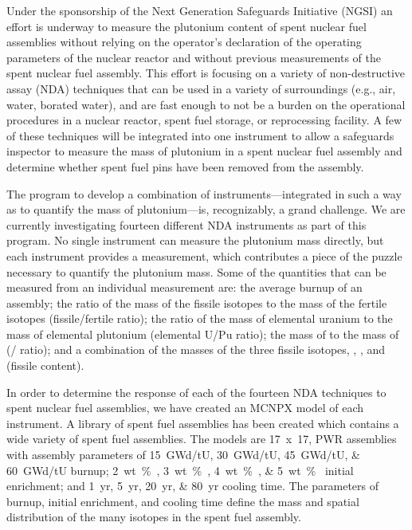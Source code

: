 \documentclass{ansnse}
\begin{document}
Under the sponsorship of the Next Generation Safeguards Initiative (NGSI) an effort is underway \citep{Tobin:2008Deter-0} to measure the plutonium content of spent nuclear fuel assemblies without relying on the operator's declaration of the operating parameters of the nuclear reactor and without previous measurements of the spent nuclear fuel assembly.  This effort is focusing on a variety of non-destructive assay (NDA) techniques that can be used in a variety of surroundings (e.g., air, water, borated water), and are fast enough to not be a burden on the operational procedures in a nuclear reactor, spent fuel storage, or reprocessing facility.  A few of these techniques will be integrated into one instrument to allow a safeguards inspector to measure the mass of plutonium in a spent nuclear fuel assembly and determine whether spent fuel pins have been removed from the assembly.

The program to develop a combination of instruments---integrated in such a way as to quantify the mass of plutonium---is, recognizably, a grand challenge.\cite{Veal:2010NGSI--0}  We are currently investigating fourteen different NDA instruments as part of this program.  No single instrument can measure the plutonium mass directly, but each instrument provides a measurement, which contributes a piece of the puzzle necessary to quantify the plutonium mass.  Some of the quantities that can be measured from an individual measurement are: the average burnup of an assembly; the ratio of the mass of the fissile isotopes to the mass of the fertile isotopes (fissile/fertile ratio); the ratio of the mass of elemental uranium to the mass of elemental plutonium (elemental U/Pu ratio); the mass of  to the mass of  (/ ratio); and a combination of the masses of the three fissile isotopes, , , and  (fissile content).

In order to determine the response of each of the fourteen NDA techniques to spent nuclear fuel assemblies, we have created an MCNPX\cite{Pelowitz:2009MCNPX-0} model of each instrument.  A library of spent fuel assemblies has been created \cite{Fensin:2009A-Mon-0} which contains a wide variety of spent fuel assemblies.  The models are \mbox{17 x 17}, PWR assemblies with assembly parameters of \SIlist[list-final-separator={, or }]{15; 30; 45; 60}{GWd/tU} burnup; \SIlist[list-final-separator={, or }]{2; 3; 4; 5}{wt \% } initial enrichment; and \SIlist[list-final-separator={, or }]{1; 5; 20; 80}{yr} cooling time.  The parameters of burnup, initial enrichment, and cooling time define the mass and spatial distribution of the many isotopes in the spent fuel assembly.  
\end{document}
